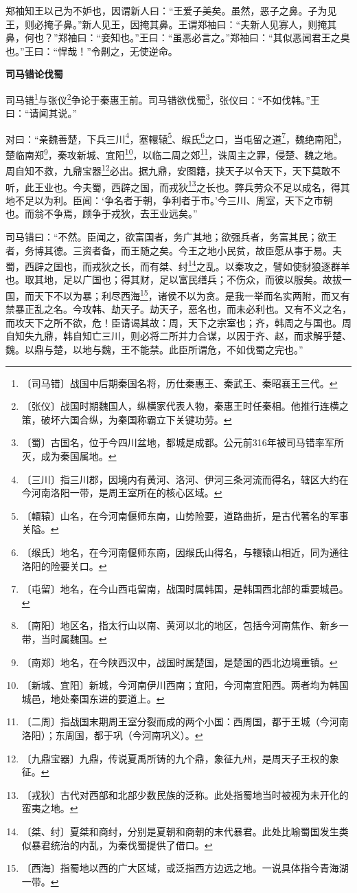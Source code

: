 \documentclass[12pt,UTF-8,openany,a4]{ctexbook}
\begin{document}
\begin{large}
    郑袖知王以己为不妒也，因谓新人曰：“王爱子美矣。虽然，恶子之鼻。子为见王，则必掩子鼻。”新人见王，因掩其鼻。王谓郑袖曰：“夫新人见寡人，则掩其鼻，何也？”郑袖曰：“妾知也。”王曰：“虽恶必言之。”郑袖曰：“其似恶闻君王之臭也。”王曰：“悍哉！”令劓之，无使逆命。
    
    \begin{center}{\Large\textbf{司马错论伐蜀}}\end{center}
    
    司马错\footnote{〔司马错〕\yiwen 战国中后期秦国名将，历仕秦惠王、秦武王、秦昭襄王三代。}与张仪\footnote{〔张仪〕\yiwen 战国时期魏国人，纵横家代表人物，秦惠王时任秦相。他推行连横之策，破坏六国合纵，为秦国称霸立下关键功劳。}争论于秦惠王前。司马错欲伐蜀\footnote{〔蜀〕\yiwen 古国名，位于今四川盆地，都城是成都。公元前316年被司马错率军所灭，成为秦国属地。}，张仪曰：“不如伐韩。”王曰：“请闻其说。”
    
    对曰：“亲魏善楚，下兵三川\footnote{〔三川〕\yiwen 指三川郡，因境内有黄河、洛河、伊河三条河流而得名，辖区大约在今河南洛阳一带，是周王室所在的核心区域。}，塞轘辕\footnote{〔轘辕〕\yiwen 山名，在今河南偃师东南，山势险要，道路曲折，是古代著名的军事关隘。}、缑氏\footnote{〔缑氏〕\yiwen 地名，在今河南偃师东南，因缑氏山得名，与轘辕山相近，同为通往洛阳的险要关口。}之口，当屯留之道\footnote{〔屯留〕\yiwen 地名，在今山西屯留南，战国时属韩国，是韩国西北部的重要城邑。}，魏绝南阳\footnote{〔南阳〕\yiwen 地区名，指太行山以南、黄河以北的地区，包括今河南焦作、新乡一带，当时属魏国。}，楚临南郑\footnote{〔南郑〕\yiwen 地名，在今陕西汉中，战国时属楚国，是楚国的西北边境重镇。}，秦攻新城、宜阳\footnote{〔新城、宜阳〕\yiwen 新城，今河南伊川西南；宜阳，今河南宜阳西。两者均为韩国城邑，地处秦国东进的要道上。}，以临二周之郊\footnote{〔二周〕\yiwen 指战国末期周王室分裂而成的两个小国：西周国，都于王城（今河南洛阳）；东周国，都于巩（今河南巩义）。}，诛周主之罪，侵楚、魏之地。周自知不救，九鼎宝器\footnote{〔九鼎宝器〕\yiwen 九鼎，传说夏禹所铸的九个鼎，象征九州，是周天子王权的象征。}必出。据九鼎，安图籍，挟天子以令天下，天下莫敢不听，此王业也。今夫蜀，西辟之国，而戎狄\footnote{〔戎狄〕\yiwen 古代对西部和北部少数民族的泛称。此处指蜀地当时被视为未开化的蛮夷之地。}之长也。弊兵劳众不足以成名，得其地不足以为利。臣闻：‘争名者于朝，争利者于市。’今三川、周室，天下之市朝也。而翁不争焉，顾争于戎狄，去王业远矣。”
    
    司马错曰：“不然。臣闻之，欲富国者，务广其地；欲强兵者，务富其民；欲王者，务博其德。三资者备，而王随之矣。今王之地小民贫，故臣愿从事于易。夫蜀，西辟之国也，而戎狄之长，而有桀、纣\footnote{〔桀、纣〕\yiwen 夏桀和商纣，分别是夏朝和商朝的末代暴君。此处比喻蜀国发生类似暴君统治的内乱，为秦伐蜀提供了借口。}之乱。以秦攻之，譬如使豺狼逐群羊也。取其地，足以广国也；得其财，足以富民缮兵；不伤众，而彼以服矣。故拔一国，而天下不以为暴；利尽西海\footnote{〔西海〕\yiwen 指蜀地以西的广大区域，或泛指西方边远之地。一说具体指今青海湖一带。}，诸侯不以为贪。是我一举而名实两附，而又有禁暴正乱之名。今攻韩、劫天子。劫天子，恶名也，而未必利也。又有不义之名，而攻天下之所不欲，危！臣请谒其故：周，天下之宗室也；齐，韩周之与国也。周自知失九鼎，韩自知亡三川，则必将二所并力合谋，以因于齐、赵，而求解乎楚、魏。以鼎与楚，以地与魏，王不能禁。此臣所谓危，不如伐蜀之完也。”
    

\end{large}
\end{document}
